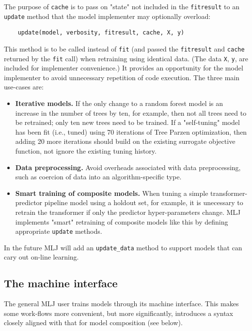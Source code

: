 \documentclass{article}
\begin{document}
The purpose of \texttt{cache} is to pass on "state" not included in the \texttt{fitresult} to an \texttt{update} method that the model implementer may optionally overload:

\begin{verbatim}
    update(model, verbosity, fitresult, cache, X, y)    
\end{verbatim}

This method is to be called instead of \texttt{fit} (and passed the \texttt{fitresult} and \texttt{cache} returned by the \texttt{fit} call) when retraining using identical data. (The data \texttt{X}, \texttt{y}, are included for implementer convenience.) It provides an opportunity for the model implementer to avoid unnecessary repetition of code execution. The three main use-cases are:

\begin{itemize}
    \item \textbf{Iterative models.} If the only change to a random forest model is an increase in the number of trees by ten, for example, then not all trees need to be retrained; only ten new trees need to be trained. If a "self-tuning" model has been fit (i.e., tuned) using 70 iterations of Tree Parzen optimization, then adding 20 more iterations should build on the existing surrogate objective function, not ignore the existing tuning history.
    \item \textbf{Data preprocessing.} Avoid overheads associated with data preprocessing, such as coercion of data into an algorithm-specific type.
    \item \textbf{Smart training of composite models.} When tuning a simple transformer-predictor pipeline model using a holdout set, for example, it is unecessary to retrain the transformer if only the predictor hyper-parameters change. MLJ implements "smart" retraining of composite models like this by defining appropriate \texttt{update} methods.
\end{itemize}

In the future MLJ will add an \texttt{update\_data} method to support models that can cary out on-line learning.

\subsection{The machine interface}

The general MLJ user trains models through its machine interface. This makes some work-flows more convenient, but more significantly, introduces a syntax closely aligned with that for model composition (see below).
\end{document}
